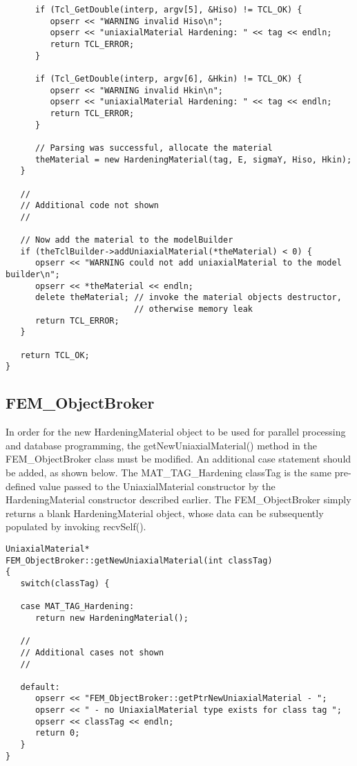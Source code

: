 \documentclass[12pt]{article}
\begin{document}
{{\begin{verbatim}
      if (Tcl_GetDouble(interp, argv[5], &Hiso) != TCL_OK) {
         opserr << "WARNING invalid Hiso\n";
         opserr << "uniaxialMaterial Hardening: " << tag << endln;
         return TCL_ERROR;	
      }

      if (Tcl_GetDouble(interp, argv[6], &Hkin) != TCL_OK) {
         opserr << "WARNING invalid Hkin\n";
         opserr << "uniaxialMaterial Hardening: " << tag << endln;
         return TCL_ERROR;	
      }

      // Parsing was successful, allocate the material
      theMaterial = new HardeningMaterial(tag, E, sigmaY, Hiso, Hkin);       
   }

   //
   // Additional code not shown
   //

   // Now add the material to the modelBuilder
   if (theTclBuilder->addUniaxialMaterial(*theMaterial) < 0) {
      opserr << "WARNING could not add uniaxialMaterial to the model builder\n";
      opserr << *theMaterial << endln;
      delete theMaterial; // invoke the material objects destructor,
                          // otherwise memory leak
      return TCL_ERROR;
   }

   return TCL_OK;
}
\end{verbatim}
}

\subsection{FEM\_ObjectBroker}
In order for the new HardeningMaterial object to be used for parallel processing and
database programming, the getNewUniaxialMaterial() method in the FEM\_ObjectBroker
class must be modified. An additional case statement should be added, as shown below.
The MAT\_TAG\_Hardening classTag is the same pre-defined value passed to the
UniaxialMaterial constructor by the HardeningMaterial constructor described earlier.
The FEM\_ObjectBroker simply returns a blank HardeningMaterial object, whose data
can be subsequently populated by invoking recvSelf().

{\sf\small
\begin{verbatim}
UniaxialMaterial*
FEM_ObjectBroker::getNewUniaxialMaterial(int classTag)
{
   switch(classTag) {

   case MAT_TAG_Hardening:
      return new HardeningMaterial();

   //
   // Additional cases not shown
   //

   default:
      opserr << "FEM_ObjectBroker::getPtrNewUniaxialMaterial - ";
      opserr << " - no UniaxialMaterial type exists for class tag ";
      opserr << classTag << endln;
      return 0;
   }        
}
\end{verbatim}
}

}
\end{document}
